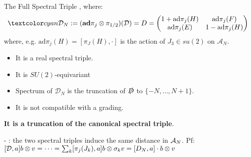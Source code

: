 \begin{frame}{The Full Spectral Triple} %
, where:
\begin{multline}
    \lbtext{\mathcal D_N} := (\textbf{ad}\pi_j \otimes \pi_{1/2})(\mathcal D) = D = \begin{pmatrix} 1 + \text{ad}\pi_j(H) & \text{ad}\pi_j(F) \\ \text{ad}\pi_j(E) & 1 - \text{ad}\pi_j(H)\end{pmatrix} 
\end{multline}
where, e.g. $\text{ad}\pi_j(H) = [\pi_J(H), \cdot ]$ is the action of $J_3 \in su(2)$ on $\mathcal A_N$.

    \begin{itemize}
    
    \item It is a real spectral triple.
    
    \item It is $SU(2)$-equivariant
    
    \item Spectrum of $\mathcal D_N$ is the truncation of $\slashed D$ to $\{-N, \dots, N+1\}$.%
    
    \item It is not compatible with a grading.
    
    \end{itemize}

\textbf{It is a truncation of the canonical spectral triple}.

- : the two spectral triples induce the same distance in $\mathcal A_N$. Pf: $[\mathcal D, a]b \otimes v = \cdots = \sum_k [\pi_j(J_k), a]b \otimes \sigma_k v = [D_N, a] \cdot b \otimes v$
\end{frame}

